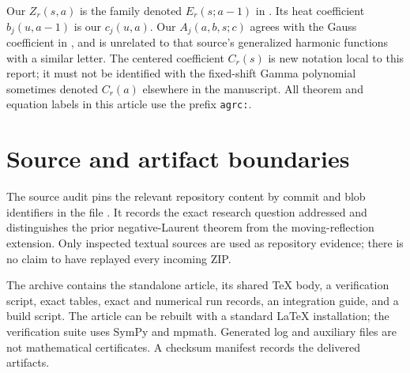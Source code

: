 Our $Z_r(s,a)$ is the family denoted $E_r(s;a-1)$ in
\cite{repo-laurent}. Its heat coefficient $b_j(u,a-1)$ is our
$c_j(u,a)$. Our $A_j(a,b,s;c)$ agrees with the Gauss coefficient in
\cite{repo-gauss}, and is unrelated to that source's generalized harmonic
functions with a similar letter. The centered coefficient $C_r(s)$ is
new notation local to this report; it must not be identified with the
fixed-shift Gamma polynomial sometimes denoted $C_r(a)$ elsewhere in
the manuscript. All theorem and equation labels in this article use
the prefix \texttt{agrc:}.

\section{Source and artifact boundaries}

The source audit pins the relevant repository content by commit and blob
identifiers in the file . It records the exact
research question addressed and distinguishes the prior negative-Laurent
 theorem from the moving-reflection extension. Only inspected textual
sources are used as repository evidence; there is no claim to have
replayed every incoming ZIP.

The archive contains the standalone article, its shared TeX body, a
verification script, exact tables, exact and numerical run records,
an integration guide, and a build script. The article can be rebuilt
with a standard LaTeX installation; the verification suite uses SymPy
and mpmath. Generated log and auxiliary files are not mathematical
certificates. A checksum manifest records the delivered artifacts.
